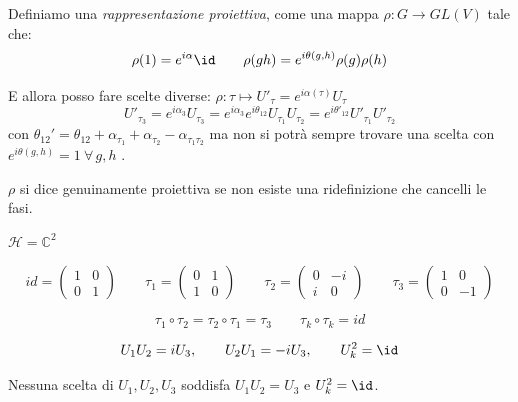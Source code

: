 \begin{definition}
    Definiamo una \textit{rappresentazione proiettiva}, come una mappa \(\rho: G \to GL(V)\) tale che:
    \[
        \rho(1) = e^{i\alpha}\id \qquad \rho(gh)= e^{i\theta(g,h)} \rho(g)\rho(h)
    \]
\end{definition}

E allora posso fare scelte diverse: \( \rho : \tau \mapsto U'_\tau = e^{i\alpha(\tau)}U_\tau\)
\[
    U'_{\tau_3} = e^{i\alpha_3} U_{\tau_3}= e^{i\alpha_3}e^{i\theta_{12}}U_{\tau_{1}}U_{\tau_2}= 
    e^{i\theta'_{12}}U'_{\tau_1}U'_{\tau_2}
\]
con \(\theta_{12}' = \theta_{12} + \alpha_{\tau_1} + \alpha_{\tau_2} - \alpha_{\tau_1\tau_2}\)
ma non si potrà sempre trovare una scelta con \(e^{i\theta(g,h)}=1 \ \forall\, g,h\) .

\begin{definition}
    \(\rho\) si dice genuinamente proiettiva se non esiste una ridefinizione che cancelli le fasi.
\end{definition}


\begin{example}
    \(\mathcal{H} = \mathbb{C}^2\)

    \[
        id = 
        \begin{pmatrix}
            1 & 0\\
            0 & 1
        \end{pmatrix}
        \qquad
        \tau_1 =
        \begin{pmatrix}
            0 & 1\\
            1 & 0
        \end{pmatrix}
        \qquad
        \tau_2 =
        \begin{pmatrix}
            0 & -i\\
            i & 0
        \end{pmatrix}
        \qquad
        \tau_3 =
        \begin{pmatrix}
            1 & 0\\
            0 & -1
        \end{pmatrix}
    \]

    \[
        \tau_1 \circ \tau_2 = \tau_2 \circ \tau_1 = \tau_3
        \qquad
        \tau_k \circ \tau_k = id
    \]

    \[
        U_1U_2 = iU_3, \qquad U_2U_1 = -iU_3, \qquad U_k^2 = \id
    \]

    Nessuna scelta di \(U_1, U_2, U_3\) soddisfa \(U_1U_2=U_3\) e \(U_k^2=\id\).
\end{example}

